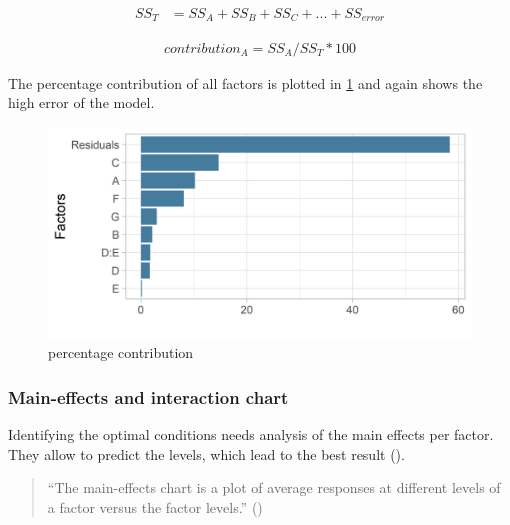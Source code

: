 \begin{equation}
	\begin{split}
		SS_T & = SS_A + SS_B + SS_C + ... + SS_{error}
	\end{split}
	 \label{equ:hyperparam_tuning:ss_t}
\end{equation}

\begin{equation}
	\begin{split}
		contribution_A = SS_A / SS_T * 100
	\end{split}
	 \label{equ:hyperparam_tuning:contribution}
\end{equation}

The percentage contribution of all factors is plotted in \ref{fig:hyperparam_tuning:percentage_contribution} and again shows the high error of the model. 

\begin{figure}[ht] 
	\includegraphics[width=1\linewidth]{simulations/taguchi/plots/percentage_contribution}
	\caption{percentage contribution}
	\label{fig:hyperparam_tuning:percentage_contribution}
\end{figure}

\subsubsection{Main-effects and interaction chart}
Identifying the optimal conditions needs analysis of the main effects per factor. They allow to predict the levels, which lead to the best result (\cite{roy_primer_1990}).

\begin{quote}
	\begin{em}
		\enquote{The main-effects chart is a plot of average responses at different levels of a factor versus the factor levels.} (\cite{yang_design_2009})
	\end{em}
\end{quote}

